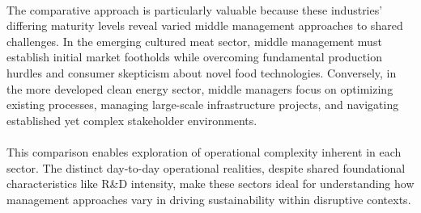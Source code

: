 	\paragraph*{} The comparative approach is particularly valuable because these industries' differing maturity levels reveal varied middle management approaches to shared challenges. In the emerging cultured meat sector, middle management must establish initial market footholds while overcoming fundamental production hurdles and consumer skepticism about novel food technologies. Conversely, in the more developed clean energy sector, middle managers focus on optimizing existing processes, managing large-scale infrastructure projects, and navigating established yet complex stakeholder environments.
	
	\paragraph*{} This comparison enables exploration of operational complexity inherent in each sector. The distinct day-to-day operational realities, despite shared foundational characteristics like R\&D intensity, make these sectors ideal for understanding how management approaches vary in driving sustainability within disruptive contexts.
		
